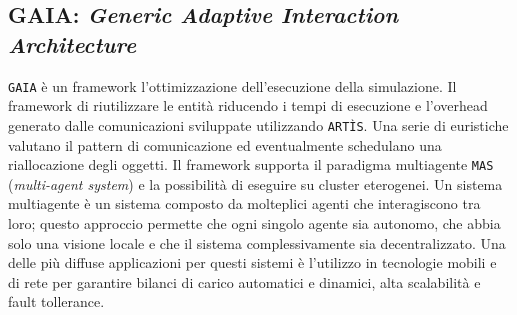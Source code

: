 \subsection{GAIA: \textit{Generic Adaptive Interaction Architecture}}
\texttt{GAIA}\cite{padssite} è un framework l'ottimizzazione dell'esecuzione della simulazione. Il framework di riutilizzare le entità riducendo i tempi di esecuzione e l'overhead generato dalle comunicazioni sviluppate utilizzando \texttt{ARTÌS}.\newline
Una serie di euristiche valutano il pattern di comunicazione ed eventualmente schedulano una riallocazione degli oggetti.
Il framework supporta il paradigma  multiagente \texttt{MAS} (\textit{multi-agent system}) e la possibilità di eseguire su cluster eterogenei.
Un sistema multiagente è un sistema composto da molteplici agenti che interagiscono tra loro; questo approccio permette che ogni singolo agente sia autonomo, che abbia solo una visione locale e che il sistema complessivamente sia decentralizzato. Una delle più diffuse applicazioni per questi sistemi è l'utilizzo in tecnologie mobili e di rete per garantire bilanci di carico automatici e dinamici, alta scalabilità e fault tollerance.

